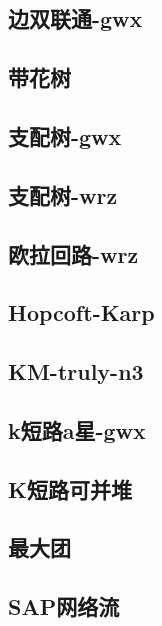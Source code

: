 \documentclass[titlepage,a4paper,10pt]{article}
\begin{document}
\begin{spacing}{0.8}
			\subsection{边双联通-gwx}
				
			\subsection{带花树}
				
			\subsection{支配树-gwx}
				
			\subsection{支配树-wrz}
				
			\subsection{欧拉回路-wrz}
				
			\subsection{Hopcoft-Karp}
				
			\subsection{KM-truly-n3}
				
			\subsection{k短路a星-gwx}
				
			\subsection{K短路可并堆}
				
			\subsection{最大团}
				
			\subsection{SAP网络流}
				

\end{spacing}
\end{document}
